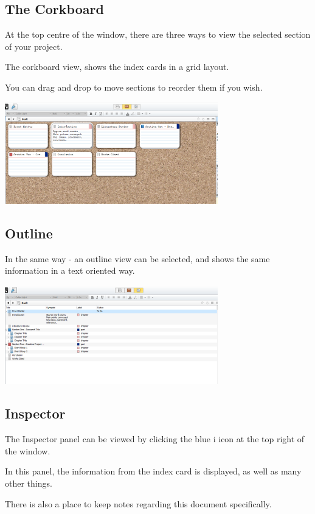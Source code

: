 \documentclass{article}
\begin{document}
\subsection{The Corkboard}

At the top centre of the window, there are three ways to view the selected section of your project. 

The corkboard view, shows the index cards in a grid layout. 

You can drag and drop to move sections to reorder them if you wish. 

\includegraphics[width=350px]{images/scriv006.PNG}

\subsection{Outline}

In the same way - an outline view can be selected, and shows the same information in a text oriented way. 

\includegraphics[width=350px]{images/scriv007.PNG}

\subsection{Inspector}

The Inspector panel can be viewed by clicking the blue i icon at the top right of the window. 

In this panel, the information from the index card is displayed, as well as many other things. 

There is also a place to keep notes regarding this document specifically.   
\end{document}
